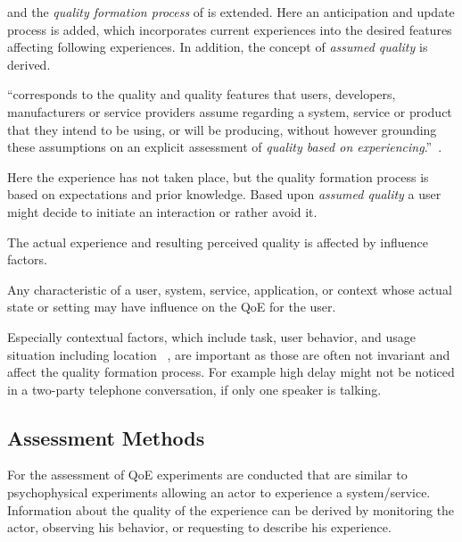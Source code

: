 \citet{raake_speech_2006} and \citet{moller_quality_2014} the \emph{quality formation process} of \citet{jekosch_voice_2005} is extended.
Here an anticipation and update process is added, which incorporates current experiences into the desired features affecting following experiences.
In addition, the concept of \emph{assumed quality} is derived.
\begin{definition}\label{def:assumedquality}
``corresponds to the quality and quality features that users, developers, manufacturers or service providers assume regarding a system, service or product that they intend to be using, or will be producing, without however grounding these assumptions on an explicit assessment of \textit{quality based on experiencing}.''~\citep[p. 20]{moller_quality_2014}.
\end{definition}
Here the experience has not taken place, but the quality formation process is based on expectations and prior knowledge.
Based upon \emph{assumed quality} a user might decide to initiate an interaction or rather avoid it.

The actual experience and resulting perceived quality is affected by influence factors.
\begin{definition}
Any characteristic of a user, system, service, application, or context whose actual state or setting may have influence on the \ac{QoE} for the user.~\citep[p. 56]{moller_quality_2014-1} %
\end{definition}
Especially contextual factors, which include task, user behavior, and usage situation including location ~\citep[p. 56]{moller_quality_2014-1}, are important as those are often not invariant and affect the quality formation process.
For example high delay might not be noticed in a two-party telephone conversation, if only one speaker is talking.

\subsection{Assessment Methods}
For the assessment of \ac{QoE} experiments are conducted that are similar to psychophysical experiments allowing an actor to experience a system/service.
Information about the quality of the experience can be derived by monitoring the actor, observing his behavior, or requesting to describe his experience.

